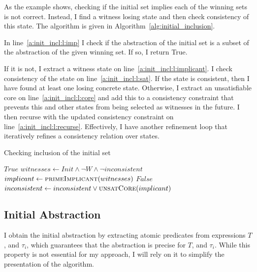 As the example shows, checking if the initial set implies each of the winning sets is not correct. Instead, I find a witness losing state and then check consistency of this state. The algorithm is given in Algorithm~\ref{alg:initial_inclusion}. 

In line~\ref{a:init_incl:l:imp} I check if the abstraction of the initial set is a subset of the abstraction of the given winning set. If so, I return True.

If it is not, I extract a witness state on line~\ref{a:init_incl:l:implicant}. I check consistency of the state on line~\ref{a:init_incl:l:sat}. If the state is consistent, then I have found at least one losing concrete state. Otherwise, I extract an unsatisfiable core on line~\ref{a:init_incl:l:core} and add this to a consistency constraint that prevents this and other states from being selected as witnesses in the future. I then recurse with the updated consistency constraint on line~\ref{a:init_incl:l:recurse}. Effectively, I have another refinement loop that iteratively refines a consistency relation over states. 

\begin{algorithm}
\caption{Checking inclusion of the initial set}
\label{alg:initial_inclusion}

\begin{algorithmic}[1]

 \label{a:init_incl:l:imp}
        \State\Return $True$
    \Else
        \State $witnesses \gets Init \land \neg W \land \neg inconsistent$ \label{a:init_incl:l:witness}
        \State $implicant \gets \Call{primeImplicant}{witnesses}$ \label{a:init_incl:l:implicant}
         \label{a:init_incl:l:sat}
            \State\Return $False$
        \Else
            \State $inconsistent \gets inconsistent \lor \Call{unsatCore}{implicant}$ \label{a:init_incl:l:core}
            \State{} \label{a:init_incl:l:recurse}
        \EndIf
    \EndIf
\EndFunction

\end{algorithmic}
\end{algorithm}

\subsection{Initial Abstraction}

I obtain the initial abstraction by extracting atomic predicates from expressions $T$, and $\tau_i$, which guarantees that the abstraction is precise for $T$, and $\tau_i$. While this property is not essential for my approach, I will rely on it to simplify the presentation of the algorithm.

